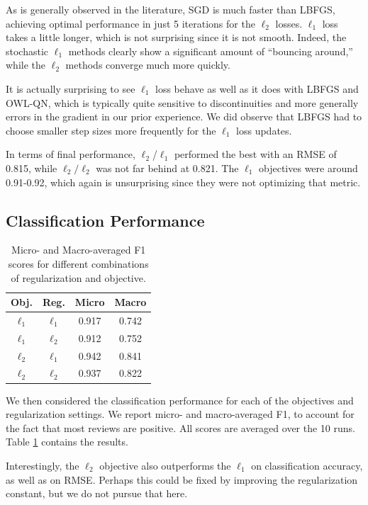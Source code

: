 \documentclass[11pt,leqno,twoside]{article}
\begin{document}
As is generally observed in the literature, SGD is much faster than LBFGS,
achieving optimal performance in just 5 iterations for the $\ell_2$
losses. $\ell_1$ loss takes a little longer, which is not surprising
since it is not smooth. Indeed, the stochastic $\ell_1$ methods
clearly show a significant amount of ``bouncing around,'' while the
$\ell_2$ methods converge much more quickly.

It is actually surprising to see $\ell_1$ loss behave as well as
it does with LBFGS and OWL-QN, which is typically quite sensitive to discontinuities
and more generally errors in the gradient in our prior experience.
We did observe that LBFGS had to choose smaller step sizes more frequently
for the $\ell_1$ loss updates.

In terms of final performance, $\ell_2$/$\ell_1$ performed the best
with an RMSE of 0.815, while $\ell_2/\ell_2$ was not far behind at
0.821. The $\ell_1$ objectives were around 0.91-0.92, which again
is unsurprising since they were not optimizing that metric.

\subsection{Classification Performance}
\begin{table}
\centering
  \begin{tabular}{|c|c|c|c|}
    \hline
    Obj. & Reg. & Micro & Macro \\
    \hline
    $\ell_1$ & $\ell_1$ & 0.917 & 0.742 \\
    $\ell_1$ & $\ell_2$ & 0.912 & 0.752 \\
    $\ell_2$ & $\ell_1$ & 0.942 & 0.841 \\
    $\ell_2$ & $\ell_2$ & 0.937 & 0.822 \\
    \hline
  \end{tabular}
  \caption{Micro- and Macro-averaged F1 scores for different combinations of regularization and objective.}
  \label{tbl:classification}
\end{table}


We then considered the classification performance for each of the
objectives and regularization settings. We report micro- and macro-averaged
F1, to account for the fact that most reviews are positive. All scores
are averaged over the 10 runs. Table \ref{tbl:classification} contains the results.

Interestingly, the $\ell_2$ objective also outperforms the $\ell_1$
on classification accuracy, as well as on RMSE. Perhaps this could
be fixed by improving the regularization constant, but we do not
pursue that here.
\end{document}
